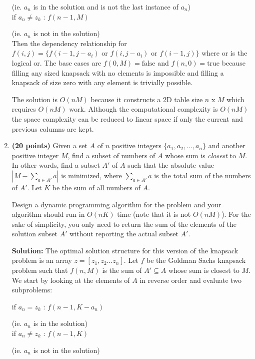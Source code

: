 \documentclass[11pt]{article}
\begin{document}
\begin{enumerate}
(ie. $a_n$ is in the solution and is not the last instance of $a_n$)\\

if $a_n \neq z_k$ : \hfill $f(n-1, M)$

(ie. $a_n$ is not in the solution)\\

Then the dependency relationship for $f(i, j) = \{ f(i-1, j-a_i) \text{ or } f(i, j-a_i) \text{ or } f(i-1, j) \}$ where or is the logical or. The base cases are $f(0, M) = \text{false}$ and $f(n, 0) = \text{true}$ because filling any sized knapsack with no elements is impossible and filling a knapsack of size zero with any element is trivially possible.

The solution is $O(nM)$ because it constructs a 2D table size $n$ x $M$ which requires $O(nM)$ work. Although the computational complexity is $O(nM)$ the space complexity can be reduced to linear space if only the current and previous columns are kept.

\item
 {\bf (20 points)}
Given a set $A$ of $n$ positive integers $\{a_1, a_2, \ldots, a_n\}$ and
another positive integer $M$, find a subset of numbers of $A$ whose
sum is {\em closest} to $M$. In other words, find a subset $A'$ of $A$ such
that the absolute value $|M-\sum_{a\in A'}a|$ is minimized, where $\sum_{a\in
A'}a$ is the total sum of the numbers of $A'$.
Let $K$ be the sum of all numbers of $A$.

Design a dynamic programming algorithm for the problem and your
algorithm should run in $O(nK)$ time (note that it is not $O(nM)$).
For the sake of simplicity, you only need to return the sum of the elements of the solution subset $A'$ without reporting the actual subset $A'$.

{\bf Solution:} The optimal solution structure for this version of the knapsack problem is an array $z=\left[ z_1, z_2\ldots z_n\right]$. Let $f$ be the Goldman Sachs knapsack problem such that $f(n, M)$ is the sum of $A'\subseteq A$ whose sum is closest to $M$. We start by looking at the elements of $A$ in reverse order and evaluate two subproblems:

if $a_n = z_k$ : \hfill $f(n-1, K-a_n)$

(ie. $a_n$ is in the solution)\\

if $a_n \neq z_k$ : \hfill $f(n-1, K)$

(ie. $a_n$ is not in the solution)\\


\end{enumerate}
\end{document}
